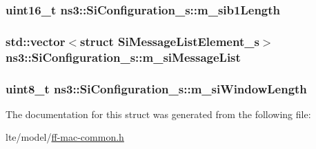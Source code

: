 \subsubsection[{\texorpdfstring{m\+\_\+sib1\+Length}{m_sib1Length}}]{\setlength{\rightskip}{0pt plus 5cm}uint16\+\_\+t ns3\+::\+Si\+Configuration\+\_\+s\+::m\+\_\+sib1\+Length}\hypertarget{structns3_1_1SiConfiguration__s_a5739d3cf4987010ca66859e3f0c746c5}{}\label{structns3_1_1SiConfiguration__s_a5739d3cf4987010ca66859e3f0c746c5}
\subsubsection[{\texorpdfstring{m\+\_\+si\+Message\+List}{m_siMessageList}}]{\setlength{\rightskip}{0pt plus 5cm}std\+::vector$<$struct {\bf Si\+Message\+List\+Element\+\_\+s}$>$ ns3\+::\+Si\+Configuration\+\_\+s\+::m\+\_\+si\+Message\+List}\hypertarget{structns3_1_1SiConfiguration__s_a530943fa395ebd8518ea274989718d07}{}\label{structns3_1_1SiConfiguration__s_a530943fa395ebd8518ea274989718d07}
\subsubsection[{\texorpdfstring{m\+\_\+si\+Window\+Length}{m_siWindowLength}}]{\setlength{\rightskip}{0pt plus 5cm}uint8\+\_\+t ns3\+::\+Si\+Configuration\+\_\+s\+::m\+\_\+si\+Window\+Length}\hypertarget{structns3_1_1SiConfiguration__s_af8658e1a3942abdba4a315497d1104d4}{}\label{structns3_1_1SiConfiguration__s_af8658e1a3942abdba4a315497d1104d4}


The documentation for this struct was generated from the following file\+:\begin{DoxyCompactItemize}
\item 
lte/model/\hyperlink{ff-mac-common_8h}{ff-\/mac-\/common.\+h}\end{DoxyCompactItemize}
